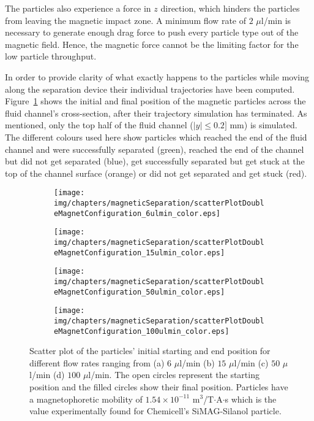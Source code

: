 The particles also experience a force in $z$ direction, which hinders the particles from leaving the magnetic impact zone. A minimum flow rate of $2$ $\mu$l/min is necessary to generate enough drag force to push every particle type out of the magnetic field. Hence, the magnetic force cannot be the limiting factor for the low particle throughput.

In order to provide clarity of what exactly happens to the particles while moving along the separation device their individual trajectories have been computed. Figure~\ref{fig:scatterPlotDoubleMagnetConfiguration} shows the initial and final position of the magnetic particles across the fluid channel's cross-section, after their trajectory simulation has terminated. As mentioned, only the top half of the fluid channel ($|y| \leq 0.2]$ mm) is simulated. The different colours used here show particles which reached the end of the fluid channel and were successfully separated (green), reached the end of the channel but did not get separated (blue), get successfully separated but get stuck at the top of the channel surface (orange) or did not get separated and get stuck (red).

\begin{figure}[htb]
        \centering
        \begin{subfigure}[b]{0.48\textwidth}
                \texttt{[image: img/chapters/magneticSeparation/scatterPlotDoubleMagnetConfiguration\_6ulmin\_color.eps]} %
                \caption{}  
        \end{subfigure}
        \begin{subfigure}[b]{0.48\textwidth}
                \texttt{[image: img/chapters/magneticSeparation/scatterPlotDoubleMagnetConfiguration\_15ulmin\_color.eps]} %
                \caption{}                
        \end{subfigure}
        \begin{subfigure}[b]{0.48\textwidth}
                \texttt{[image: img/chapters/magneticSeparation/scatterPlotDoubleMagnetConfiguration\_50ulmin\_color.eps]} %
                \caption{}                
        \end{subfigure}
        \begin{subfigure}[b]{0.48\textwidth}
                \texttt{[image: img/chapters/magneticSeparation/scatterPlotDoubleMagnetConfiguration\_100ulmin\_color.eps]} %
                \caption{}                
        \end{subfigure}
        \caption[Scatter plot of particles' initial starting end end position for different flow rates using the double magnet configuration]{Scatter plot of the particles' initial starting and end position for different flow rates ranging from (a) $6$ $\mu$l/min (b) $15$ $\mu$l/min (c) $50$ $\mu$l/min (d) $100$ $\mu$l/min. The open circles represent the starting position and the filled circles show their final position. Particles have a magnetophoretic mobility of $1.54 \times 10^{-11}$ m$^3$/T$\cdot$A$\cdot$s which is the value experimentally found for Chemicell's SiMAG-Silanol particle.}
        \label{fig:scatterPlotDoubleMagnetConfiguration}
\end{figure}

